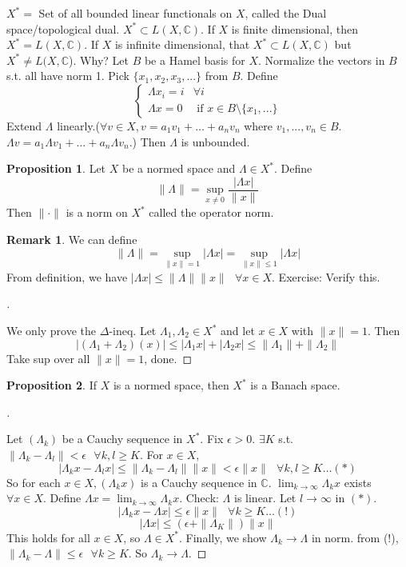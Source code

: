 \documentclass{article}
\newcommand{\sfa}{\text{  } \forall}
\theoremstyle{definition}
\newtheorem{rem}{Remark}
\newtheorem{prop}{Proposition}
\newenvironment{proofs}[1][\proofname]{%
  \begin{proof}[#1]$ $\par\nobreak\ignorespaces
}{%
  \end{proof}
}
\begin{document}
$X^* = $ Set of all bounded linear functionals on $X$, called the Dual space/topological dual.
$X^* \subset L(X, \mathbb{C})$.
If $X$ is finite dimensional, then $X^* = L(X, \mathbb{C})$. 
If $X$ is infinite dimensional, that $X^* \subset L(X, \mathbb{C})$ but $X^* \neq L(X, \mathbb{C}$). 
Why? 
Let $B$ be a Hamel basis for $X$.
Normalize the vectors in $B$ s.t. all have norm 1.
Pick $\{x_1, x_2, x_3, ...\}$ from $B$. 
Define
\[
	\begin{cases}
		\Lambda x_i = i & \forall i\\
		\Lambda x = 0 & \text{ if } x \in B \setminus \{x_1, ...\}
	\end{cases}
\]
Extend $\Lambda$ linearly.($ \forall v \in X, v = a_1 v_1 + \hdots + a_n v_n$ where $v_1, ..., v_n \in B$. $\Lambda v = a_1 \Lambda v_1 + \hdots + a_n \Lambda v_n$.)
Then $\Lambda$ is unbounded.

\begin{prop}
	Let $X$ be a normed space and $\Lambda \in X^*$. 
	Define 
	\[
		\|\Lambda\| = \sup_{x \neq 0} \frac{|\Lambda x|}{\|x\|}
	\]
	Then $\| \cdot \|$ is a norm on $X^*$ called the operator norm. 
\end{prop}

\begin{rem}
	We can define
	\[
		\| \Lambda \| = \sup_{\|x\| = 1} |\Lambda x| = \sup_{\| x \| \leq 1} |\Lambda x|
	\]
	From definition, we have $|\Lambda x| \leq \| \Lambda \| \|x\| \sfa x \in X$. 
	Exercise: Verify this. 
\end{rem}

\begin{proofs}
	We only prove the $\Delta$-ineq. 
	Let $\Lambda_1, \Lambda_2 \in X^*$ and let $x \in X$ with $\|x\| = 1$. 
	Then
	\[
		|(\Lambda_1 + \Lambda_2)(x)| \leq |\Lambda_1 x| + |\Lambda_2 x| \leq \|\Lambda_1 \| + \| \Lambda_2 \|
	\]
	Take sup over all $\|x\| = 1$, done.
\end{proofs}

\begin{prop}
	If $X$ is a normed space, then $X^*$ is a Banach space.
\end{prop}

\begin{proofs}
	Let $(\Lambda_k)$ be a Cauchy sequence in $X^*$.
	Fix $\epsilon > 0$.
	$\exists K$ s.t. $\|\Lambda_k - \Lambda_l\| < \epsilon \sfa k, l \geq K$. 
	For $x \in X$, 
	\[
		|\Lambda_k x- \Lambda_l x| \leq \|\Lambda_k - \Lambda_l \| \|x \| < \epsilon \|x\| \sfa k, l \geq K \hdots (*)
	\]
	So for each $x \in X, (\Lambda_k x)$ is a Cauchy sequence in $\mathbb{C}$.
	$\lim_{k \to \infty} \Lambda_k x$ exists $\forall x \in X$. 
	Define $\Lambda x = \lim_{k \to \infty} \Lambda_k x$.
	Check: $\Lambda$ is linear. 
	Let $l \to \infty$ in $(*)$.
	\[
		|\Lambda_k x - \Lambda x| \leq \epsilon \|x\| \sfa k \geq K \hdots (!)
	\]
	\[
		|\Lambda x| \leq (\epsilon + \|\Lambda_{K}\|) \|x\|
	\]
	This holds for all $x \in X$, so $\Lambda \in X^*$. Finally, we show $\Lambda_k \to \Lambda$ in norm.
	from (!), $\| \Lambda_k - \Lambda\| \leq \epsilon \sfa k \geq K$.
	So $\Lambda_k \to \Lambda$.
\end{proofs}
\end{document}
